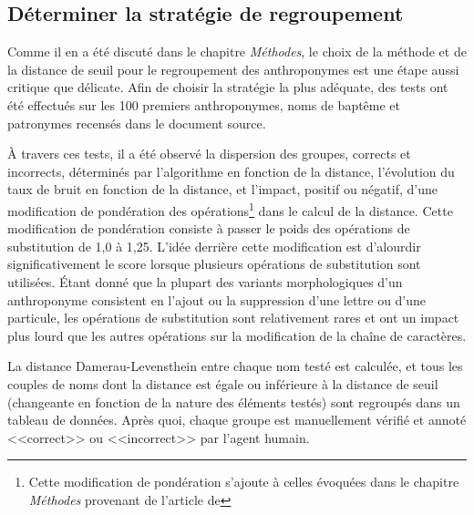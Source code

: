 \subsection{Déterminer la stratégie de regroupement}
Comme  il en a été discuté dans le chapitre \textit{Méthodes}, le choix de la méthode et de la distance de seuil pour le regroupement des anthroponymes est une étape aussi critique que délicate.
Afin de choisir la stratégie la plus adéquate, des tests ont été effectués sur les 100 premiers anthroponymes, noms de baptême et patronymes recensés dans le document source.

À travers ces tests, il a été observé la dispersion des groupes, corrects et incorrects, déterminés par l'algorithme en fonction de la distance, l'évolution du taux de bruit en fonction de la distance, et l'impact, positif ou négatif, d'une modification de pondération des opérations\footnote{Cette modification de pondération s'ajoute à celles évoquées dans le chapitre \textit{Méthodes} provenant de l'article de } dans le calcul de la distance.
Cette modification de pondération consiste à passer le poids des opérations de substitution de 1,0 à 1,25.
L'idée derrière cette modification est d'alourdir significativement le score lorsque plusieurs opérations de substitution sont utilisées. 
Étant donné que la plupart des variants morphologiques d'un anthroponyme consistent en l'ajout ou la suppression d'une lettre ou d'une particule, les opérations de substitution sont relativement rares et ont un impact plus lourd que les autres opérations sur la modification de la chaîne de caractères.

La distance Damerau-Levensthein entre chaque nom testé est calculée, et tous les couples de noms dont la distance est égale ou inférieure à la distance de seuil (changeante en fonction de la nature des éléments testés) sont regroupés dans un tableau de données. Après quoi, chaque groupe est manuellement vérifié et annoté <<correct>> ou <<incorrect>> par l'agent humain.

